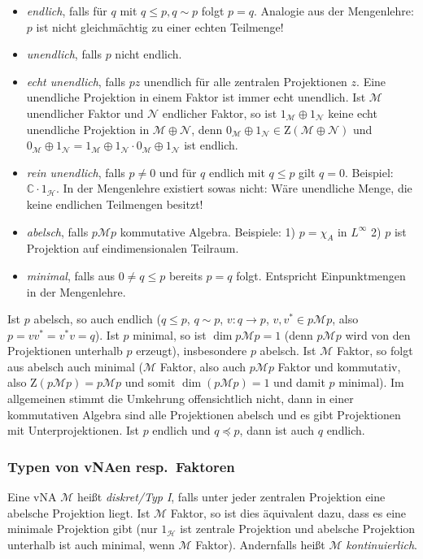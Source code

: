 \documentclass[11pt,a4paper]{scrartcl}
\newcommand{\C}{\mathbb{C}} %
\newcommand{\Hc}{\mathcal{H}}
\newcommand{\M}{\mathcal{M}}
\newcommand{\Nc}{\mathcal{N}}
\theoremstyle{plain}
\theoremstyle{definition}
\theoremstyle{remark}
\begin{document}
\begin{itemize}
    \item \emph{endlich}, falls für $q$ mit $q\leq p, q\sim p$ folgt $p=q$. Analogie aus der Mengenlehre: $p$ ist nicht gleichmächtig zu einer echten Teilmenge!
    \item \emph{unendlich}, falls $p$ nicht endlich.
    \item \emph{echt unendlich}, falls $pz$ unendlich für alle zentralen Projektionen $z$. Eine unendliche Projektion in einem Faktor ist immer echt unendlich. Ist $\M$ unendlicher Faktor und $\Nc$ endlicher Faktor, so ist $1_\M \oplus 1_\Nc$ keine echt unendliche Projektion in $\M\oplus \Nc$, denn $0_\M \oplus 1_\Nc \in \mathrm{Z}(\M\oplus \Nc)$ und $0_\M\oplus 1_\Nc=1_\M \oplus 1_\Nc \cdot 0_\M \oplus 1_\Nc$ ist endlich.
    \item \emph{rein unendlich}, falls $p\neq 0$ und für $q$ endlich mit $q\leq p$ gilt $q=0$. Beispiel: $\C\cdot 1_\Hc$. In der Mengenlehre existiert sowas nicht: Wäre unendliche Menge, die keine endlichen Teilmengen besitzt!
    \item \emph{abelsch}, falls $p\M p$ kommutative Algebra. Beispiele: 1) $p=\chi_A$ in $L^\infty$ 2) $p$ ist Projektion auf eindimensionalen Teilraum.
    \item \emph{minimal}, falls aus $0\neq q \leq p$ bereits $p=q$ folgt. Entspricht Einpunktmengen in der Mengenlehre.
\end{itemize}

Ist $p$ abelsch, so auch endlich ($q\leq p$, $q\sim p$, $v:q\to p$, $v,v^*\in p\M p$, also $p=vv^*=v^*v=q$). Ist $p$ minimal, so ist $\dim p\M p=1$ (denn $p\M p$ wird von den Projektionen unterhalb $p$ erzeugt), insbesondere $p$ abelsch. Ist $\M$ Faktor, so folgt aus abelsch auch minimal ($\M$ Faktor, also auch $p\M p$ Faktor und kommutativ, also $\mathrm{Z}(p\M p)=p\M p$ und somit $\dim(p\M p)=1$ und damit $p$ minimal). Im allgemeinen stimmt die Umkehrung offensichtlich nicht, dann in einer kommutativen Algebra sind alle Projektionen abelsch und es gibt Projektionen mit Unterprojektionen. Ist $p$ endlich und $q\preccurlyeq p$, dann ist auch $q$ endlich.

\subsubsection{Typen von vNAen resp.\ Faktoren}

Eine vNA $\M$ heißt \emph{diskret/Typ I}, falls unter jeder zentralen Projektion eine abelsche Projektion liegt. Ist $\M$ Faktor, so ist dies äquivalent dazu, dass es eine minimale Projektion gibt (nur $1_\Hc$ ist zentrale Projektion und abelsche Projektion unterhalb ist auch minimal, wenn $\M$ Faktor). Andernfalls heißt $\M$ \emph{kontinuierlich}.
\end{document}
